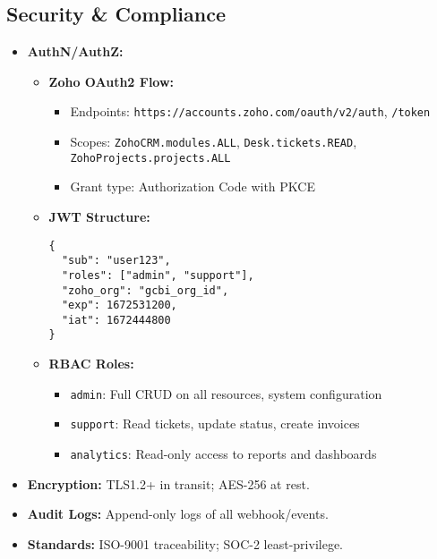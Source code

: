 \subsection{Security \& Compliance}
\begin{itemize}
  \item \textbf{AuthN/AuthZ:} 
    \begin{itemize}
      \item \textbf{Zoho OAuth2 Flow:} 
        \begin{itemize}
          \item Endpoints: \texttt{https://accounts.zoho.com/oauth/v2/auth}, \texttt{/token}
          \item Scopes: \texttt{ZohoCRM.modules.ALL}, \texttt{Desk.tickets.READ}, \texttt{ZohoProjects.projects.ALL}
          \item Grant type: Authorization Code with PKCE
        \end{itemize}
      \item \textbf{JWT Structure:} 
        \begin{verbatim}
{
  "sub": "user123",
  "roles": ["admin", "support"],
  "zoho_org": "gcbi_org_id",
  "exp": 1672531200,
  "iat": 1672444800
}
        \end{verbatim}
      \item \textbf{RBAC Roles:}
        \begin{itemize}
          \item \texttt{admin}: Full CRUD on all resources, system configuration
          \item \texttt{support}: Read tickets, update status, create invoices
          \item \texttt{analytics}: Read-only access to reports and dashboards
        \end{itemize}
    \end{itemize}
  \item \textbf{Encryption:} TLS1.2+ in transit; AES-256 at rest.
  \item \textbf{Audit Logs:} Append-only logs of all webhook/events.
  \item \textbf{Standards:} ISO-9001 traceability; SOC-2 least-privilege.
\end{itemize} 